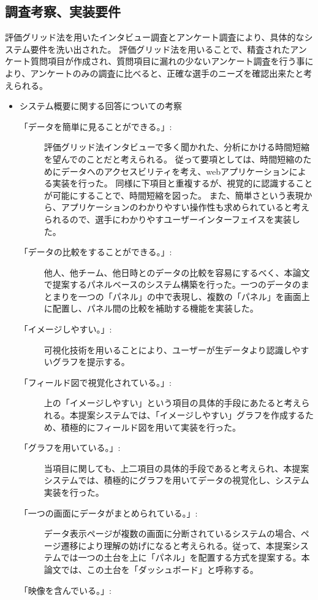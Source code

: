 \documentclass[sotsuron]{kuee}
\begin{document}
\subsection{調査考察、実装要件}
評価グリッド法を用いたインタビュー調査とアンケート調査により、具体的なシステム要件を洗い出された。
評価グリッド法を用いることで、精査されたアンケート質問項目が作成され、質問項目に漏れの少ないアンケート調査を行う事により、アンケートのみの調査に比べると、正確な選手のニーズを確認出来たと考えられる。
\begin{itemize}
	\item システム概要に関する回答についての考察
		\begin{description}
			\item [「データを簡単に見ることができる。」:]
			評価グリッド法インタビューで多く聞かれた、分析にかける時間短縮を望んでのことだと考えられる。
			従って要項としては、時間短縮のためにデータへのアクセスビリティを考え、webアプリケーションによる実装を行った。
			同様に下項目と重複するが、視覚的に認識することが可能にすることで、時間短縮を図った。
			また、簡単さという表現から、アプリケーションのわかりやすい操作性も求められていると考えられるので、選手にわかりやすユーザーインターフェイスを実装した。
			\item [「データの比較をすることができる。」:]
			他人、他チーム、他日時とのデータの比較を容易にするべく、本論文で提案するパネルベースのシステム構築を行った。一つのデータのまとまりを一つの「パネル」の中で表現し、複数の「パネル」を画面上に配置し、パネル間の比較を補助する機能を実装した。
			\item [「イメージしやすい。」:]
			可視化技術を用いることにより、ユーザーが生データより認識しやすいグラフを提示する。
			\item [「フィールド図で視覚化されている。」:]
			上の「イメージしやすい」という項目の具体的手段にあたると考えられる。本提案システムでは、「イメージしやすい」グラフを作成するため、積極的にフィールド図を用いて実装を行った。
			\item [「グラフを用いている。」:]
			当項目に関しても、上二項目の具体的手段であると考えられ、本提案システムでは、積極的にグラフを用いてデータの視覚化し、システム実装を行った。
			\item [「一つの画面にデータがまとめられている。」:]
			データ表示ページが複数の画面に分断されているシステムの場合、ページ遷移により理解の妨げになると考えられる。従って、本提案システムでは一つの土台を上に「パネル」を配置する方式を提案する。本論文では、この土台を「ダッシュボード」と呼称する。
			\item [「映像を含んでいる。」:]

\end{description}
\end{itemize}
\end{document}
